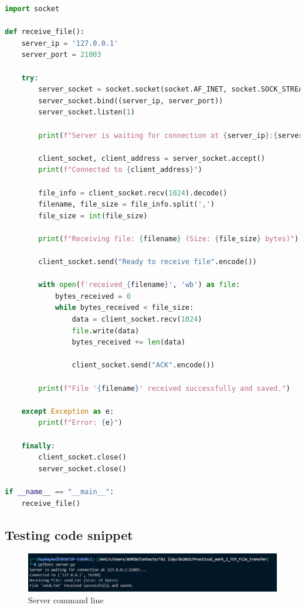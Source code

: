 \documentclass{article}
\begin{document}
\begin{lstlisting}[language=Python, caption=Server code for file transfer using TCP/IP]
import socket

def receive_file():
    server_ip = '127.0.0.1'
    server_port = 21003

    try:
        server_socket = socket.socket(socket.AF_INET, socket.SOCK_STREAM)
        server_socket.bind((server_ip, server_port))
        server_socket.listen(1)

        print(f"Server is waiting for connection at {server_ip}:{server_port}...")

        client_socket, client_address = server_socket.accept()
        print(f"Connected to {client_address}")

        file_info = client_socket.recv(1024).decode()
        filename, file_size = file_info.split(',')
        file_size = int(file_size)

        print(f"Receiving file: {filename} (Size: {file_size} bytes)")

        client_socket.send("Ready to receive file".encode())

        with open(f'received_{filename}', 'wb') as file:
            bytes_received = 0
            while bytes_received < file_size:
                data = client_socket.recv(1024)
                file.write(data)
                bytes_received += len(data)

                client_socket.send("ACK".encode())

        print(f"File '{filename}' received successfully and saved.")

    except Exception as e:
        print(f"Error: {e}")

    finally:
        client_socket.close()
        server_socket.close()

if __name__ == "__main__":
    receive_file()
\end{lstlisting}

\subsection{Testing code snippet}

\begin{figure}[h]
    \centering
    \includegraphics[width=1\linewidth]{Figure/server.png}
    \caption{Server command line}
    \label{fig:server_command_line}
\end{figure}
\end{document}
